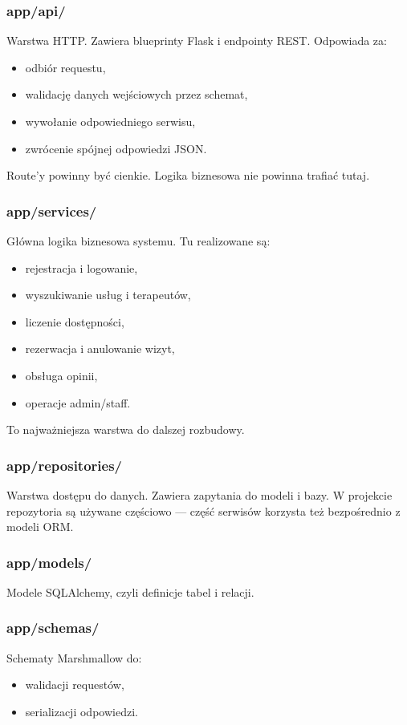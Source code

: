 \documentclass[11pt,a4paper]{article}
\begin{document}
\subsubsection*{app/api/}
Warstwa HTTP. Zawiera blueprinty Flask i endpointy REST. Odpowiada za:
\begin{itemize}[leftmargin=1.2cm]
    \item odbiór requestu,
    \item walidację danych wejściowych przez schemat,
    \item wywołanie odpowiedniego serwisu,
    \item zwrócenie spójnej odpowiedzi JSON.
\end{itemize}

Route'y powinny być cienkie. Logika biznesowa nie powinna trafiać tutaj.

\subsubsection*{app/services/}
Główna logika biznesowa systemu. Tu realizowane są:
\begin{itemize}[leftmargin=1.2cm]
    \item rejestracja i logowanie,
    \item wyszukiwanie usług i terapeutów,
    \item liczenie dostępności,
    \item rezerwacja i anulowanie wizyt,
    \item obsługa opinii,
    \item operacje admin/staff.
\end{itemize}

To najważniejsza warstwa do dalszej rozbudowy.

\subsubsection*{app/repositories/}
Warstwa dostępu do danych. Zawiera zapytania do modeli i bazy. W projekcie repozytoria są używane częściowo --- część serwisów korzysta też bezpośrednio z modeli ORM.

\subsubsection*{app/models/}
Modele SQLAlchemy, czyli definicje tabel i relacji.

\subsubsection*{app/schemas/}
Schematy Marshmallow do:
\begin{itemize}[leftmargin=1.2cm]
    \item walidacji requestów,
    \item serializacji odpowiedzi.
\end{itemize}
\end{document}
